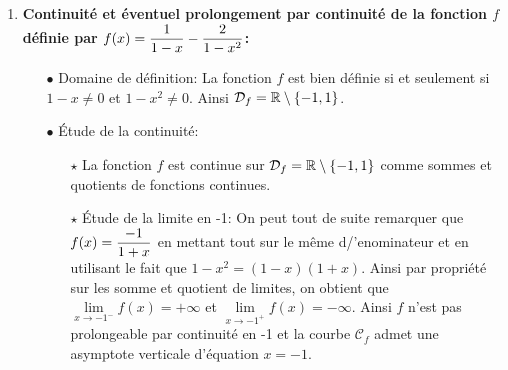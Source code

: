 \documentclass[a4paper, 11pt,reqno]{article}
\begin{document}
\begin{correction}
\begin{enumerate}
\begin{itemize}
\begin{itemize}
				            \item[$\star$] \'Etude d'un \'eventuel prolongement par continuit\'e en 1: on pose $X=x-1$ et on obtient que $f(x)=F(X)=\ddp\frac{1+X}{2+X}\times \ddp\frac{\ln{(1+X)}}{X}$. Par les \'equivalents usuels en 0, on a: $ \ddp\frac{\ln{(1+X)}}{X}\underset{0}{\thicksim} 1$. Et ainsi par propri\'et\'es sur les sommes, quotient et produit de limites, on obtient que: $\lim\limits_{x\to 1} f(x)=\ddp\demi$. Ainsi la fonction $f$ est prolongeable par continuit\'e en 1 en posant $f(1)=\ddp\demi$.
			            \end{itemize}
			            On obtient alors une nouvelle fonction que l'on continue de noter $f$ qui est d\'efinie sur $\lbrack 0,+\infty\lbrack$ par $f(x)=\left\lbrace \begin{array}{ll}  \ddp\frac{x\ln{x}}{x^2-1} & \hbox{si}\ x>0,\ x\not= 1\vsec\\ 0 & \hbox{si}\ x=0\vsec\\ \ddp\demi& \hbox{si}\ x=1.\vsec  \end{array}\right.$ Cette fonction est alors bien continue sur $\lbrack 0,+\infty\lbrack$ car elle est continue sur $\rbrack 0,+\infty\lbrack\setminus\lbrace 1\rbrace$ comme compos\'ee et somme de fonctions continues et elle est continue en 0 et en 1 par prolongement.
		      \end{itemize}
		\item \textbf{Continuit\'e et \'eventuel prolongement par continuit\'e de la fonction $f$ d\'efinie par $f(x)=\displaystyle\frac{1}{1-x}-\displaystyle\frac{2}{1-x^2}$:}
		      \begin{itemize}
			      \item[$\bullet$] Domaine de d\'efinition: La fonction $f$ est bien d\'efinie si et seulement si $1-x\not= 0$ et $1-x^2\not= 0$. Ainsi $\mathcal{D}_{f}=\mathbb{R}\setminus\lbrace -1,1\rbrace$.
			      \item[$\bullet$] \'Etude de la continuit\'e:
			            \begin{itemize}
				            \item[$\star$] La fonction $f$ est continue sur $\mathcal{D}_{f}=\mathbb{R}\setminus\lbrace -1,1\rbrace$ comme sommes et quotients de fonctions continues.
				            \item[$\star$] \'Etude de la limite en -1: On peut tout de suite remarquer que $f(x)=\displaystyle\frac{-1}{1+x}$ en mettant tout sur le m\^{e}me d/'enominateur et en utilisant le fait que $1-x^2=(1-x)(1+x)$. Ainsi par propri\'et\'e sur les somme et quotient de limites, on obtient que $\lim\limits_{x\to -1^-} f(x)=+\infty$ et $\lim\limits_{x\to -1^+} f(x)=-\infty$. Ainsi $f$ n'est pas prolongeable par continuit\'e en -1 et la courbe $\mathcal{C}_{f}$ admet une asymptote verticale d'\'equation $x=-1$.

\end{itemize}
\end{itemize}
\end{enumerate}
\end{correction}
\end{document}
